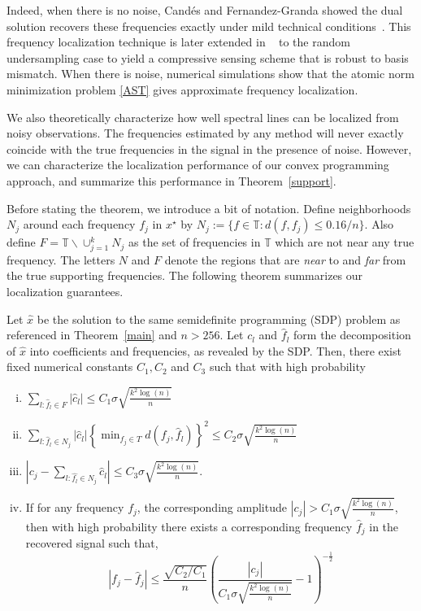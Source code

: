 Indeed, when there is no noise, Cand\'es and Fernandez-Granda showed the dual
solution recovers these frequencies exactly under mild technical
conditions~\cite{CandesGranda}. This frequency localization technique is later
extended in ~\cite{offgrid2012} to the random undersampling case to yield a
compressive sensing scheme that is robust to basis mismatch. When there is
noise, numerical simulations show that the atomic norm minimization problem
\eqref{AST} gives approximate frequency localization.

We also theoretically characterize how well spectral lines can be localized from noisy observations.  The frequencies estimated by any method will never exactly coincide with the true frequencies in the signal in the presence of noise. However, we can characterize the localization performance of our convex programming approach, and summarize this performance in Theorem~\ref{support}.

Before stating the theorem, we introduce a bit of notation. Define neighborhoods $N_j$ around each frequency $f_j$ in $x^\star$ by $N_j := \{ f \in \mathbb{T} : d(f,f_j) \leq 0.16/n\}$. Also define $F = \mathbb{T}\backslash \cup_{j=1}^k N_j$ as the set of frequencies in $\mathbb{T}$ which are not near any true frequency.  The letters $N$ and $F$ denote the regions that are \emph{near} to and \emph{far} from the true supporting frequencies.  The following theorem summarizes our localization guarantees.

\begin{theorem} \label{support} Let $\hat{x}$ be the solution to the same
semidefinite programming (SDP) problem as referenced in Theorem~\ref{main} and
$n > 256$. Let $\hat{c_l}$ and $\hat{f}_l$ form the decomposition of $\hat{x}$
into coefficients and frequencies, as revealed by the SDP. Then, there exist
fixed numerical constants $C_1,C_2$ and $C_3$ such that with high probability
\begin{enumerate}[i.)] \item $\sum_{l : \hat{f}_l \in F} |\hat{c}_l| \leq C_1
\sigma\sqrt{\frac{k^2 \log(n)}{n}}$ \item $\sum_{l : \hat{f}_l \in N_j}
|\hat{c}_l| \left\{ \min_{f_j \in T} d(f_j,\hat{f}_l) \right\}^2 \leq C_2
\sigma\sqrt{\frac{k^2 \log(n)}{n}}$ \item $\left| c_j - \sum_{l : \hat{f_l} \in
N_j} \hat{c}_l \right| \leq C_3 \sigma\sqrt{\frac{k^2 \log(n)}{n}}$. \item If
for any frequency $f_j$, the corresponding amplitude $|c_j| > C_1 \sigma
\sqrt{\frac{ k^2 \log(n)}{n}}$, then with high probability there exists a
corresponding frequency $\hat{f}_j$ in the recovered signal such that, \[ \left|
f_j - \hat{f}_j \right| \leq \frac{\sqrt{C_2/C_1}}{n}\left(\frac{|c_j|}{C_1
\sigma \sqrt{\frac{ k^2 \log(n)}{n}}} - 1\right)^{-\tfrac{1}{2}} \]
\end{enumerate} \end{theorem}

